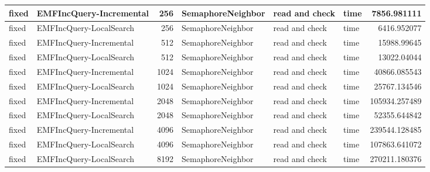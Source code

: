 \begin{table}
\begin{tabular}{| l | l | r | l | l | l | r |}
fixed & EMFIncQuery-Incremental & 256 & SemaphoreNeighbor & read and check & time & 7856.981111\\\hline
fixed & EMFIncQuery-LocalSearch & 256 & SemaphoreNeighbor & read and check & time & 6416.952077\\\hline
fixed & EMFIncQuery-Incremental & 512 & SemaphoreNeighbor & read and check & time & 15988.99645\\\hline
fixed & EMFIncQuery-LocalSearch & 512 & SemaphoreNeighbor & read and check & time & 13022.04044\\\hline
fixed & EMFIncQuery-Incremental & 1024 & SemaphoreNeighbor & read and check & time & 40866.085543\\\hline
fixed & EMFIncQuery-LocalSearch & 1024 & SemaphoreNeighbor & read and check & time & 25767.134546\\\hline
fixed & EMFIncQuery-Incremental & 2048 & SemaphoreNeighbor & read and check & time & 105934.257489\\\hline
fixed & EMFIncQuery-LocalSearch & 2048 & SemaphoreNeighbor & read and check & time & 52355.644842\\\hline
fixed & EMFIncQuery-Incremental & 4096 & SemaphoreNeighbor & read and check & time & 239544.128485\\\hline
fixed & EMFIncQuery-LocalSearch & 4096 & SemaphoreNeighbor & read and check & time & 107863.641072\\\hline
fixed & EMFIncQuery-LocalSearch & 8192 & SemaphoreNeighbor & read and check & time & 270211.180376\\\hline


\end{tabular}
\end{table}
